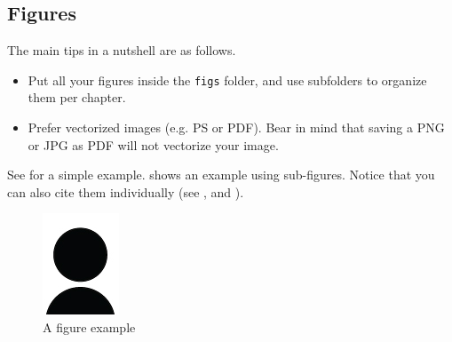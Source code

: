 \subsection{Figures}
\label{sec:c1:latex_figures}

The main tips in a nutshell are as follows.
\begin{itemize}
    \item Put all your figures inside the \texttt{figs} folder,
          and use subfolders to organize them per chapter.
    \item Prefer vectorized images (e.g. PS or PDF).
          Bear in mind that saving a PNG or JPG as PDF
          will not vectorize your image.
\end{itemize}

See  for a simple example.
 shows an example using sub-figures.
Notice that you can also cite them individually
(see ,  and ).

\begin{figure}
    \centering
    \includegraphics[width=.2\textwidth]{figs/cv/author}
    \caption{A figure example}
    \label{fig:c1:simpleexample}
\end{figure}


